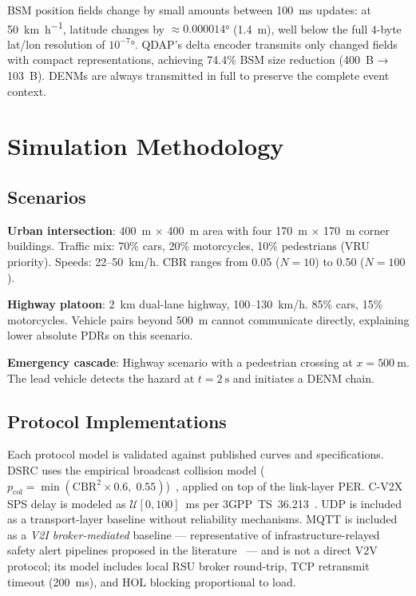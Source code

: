 \documentclass[journal]{IEEEtran}
\begin{document}
BSM position fields change by small amounts between 100~ms updates:
at \SI{50}{\kilo\metre\per\hour}, latitude changes by $\approx 0.000014$°
(1.4~m), well below the full 4-byte lat/lon resolution of $10^{-7}$°.
QDAP's delta encoder transmits only changed fields with compact
representations, achieving 74.4\% BSM size reduction (400~B → 103~B).
DENMs are always transmitted in full to preserve the complete event context.


\section{Simulation Methodology}
\label{sec:methodology}

\subsection{Scenarios}

\textbf{Urban intersection}: 400~m $\times$ 400~m area with four
170~m $\times$ 170~m corner buildings.
Traffic mix: 70\% cars, 20\% motorcycles, 10\% pedestrians (VRU priority).
Speeds: 22–50~km/h.
CBR ranges from 0.05 ($N{=}10$) to 0.50 ($N{=}100$).

\textbf{Highway platoon}: 2~km dual-lane highway, 100–130~km/h.
85\% cars, 15\% motorcycles.
Vehicle pairs beyond \SI{500}{\metre} cannot communicate directly, explaining
lower absolute PDRs on this scenario.

\textbf{Emergency cascade}: Highway scenario with a pedestrian crossing
at $x = \SI{500}{\metre}$.
The lead vehicle detects the hazard at $t = \SI{2}{\second}$ and initiates
a DENM chain.

\subsection{Protocol Implementations}

Each protocol model is validated against published curves and specifications.
DSRC uses the empirical broadcast collision model ($p_{\text{col}} = \min(\mathrm{CBR}^2
\times 0.6,\; 0.55)$)~\cite{Sepulcre2011}, applied on top of the link-layer PER.
C-V2X SPS delay is modeled as $\mathcal{U}[0, 100]$~ms per
3GPP~TS~36.213~\cite{3GPP_TS_36213}.
UDP is included as a transport-layer baseline without reliability mechanisms.
MQTT is included as a \emph{V2I broker-mediated} baseline — representative of
infrastructure-relayed safety alert pipelines proposed in the
literature~\cite{Lyu2021} — and is not a direct V2V protocol; its model
includes local RSU broker round-trip, TCP retransmit timeout (\SI{200}{\milli\second}),
and HOL blocking proportional to load.
\end{document}
